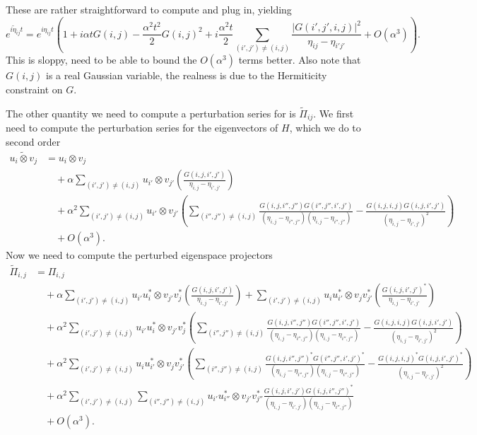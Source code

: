 \documentclass{article}
\newcommand{\parens}[1]{\left( #1 \right)}
\newcommand{\abs}[1]{\left| #1 \right|}
\newcommand{\bigo}[1]{O\left( #1 \right)}
\begin{document}
These are rather straightforward to compute and plug in, yielding
\begin{equation}
    e^{i \widetilde{\eta}_{ij} t} = e^{i \eta_{ij} t}\parens{1 + i \alpha t G(i,j) - \frac{\alpha^2 t^2}{2} G(i,j)^2 + i \frac{\alpha^2 t}{2} \sum_{(i',j') \neq (i,j)}\frac{\abs{G(i',j',i,j)}^2}{\eta_{ij} - \eta_{i' j'}} + \bigo{\alpha^3}}.
\end{equation}
This is sloppy, need to be able to bound the $\bigo{\alpha^3}$ terms better. Also note that $G(i,j)$ is a real Gaussian variable, the realness is due to the Hermiticity constraint on $G$. 

The other quantity we need to compute a perturbation series for is $\widetilde{\Pi}_{ij}$. We first need to compute the perturbation series for the eigenvectors of $H$, which we do to second order
\begin{align}
    \widetilde{u_i \otimes v_j} &= u_i \otimes v_j \\
    &\quad + \alpha \sum_{(i',j') \neq (i,j)} u_{i'} \otimes v_{j'} \parens{  \frac{G(i,j,i',j')}{\eta_{i,j} - \eta_{i',j'}} } \\
    &\quad + \alpha^2 \sum_{(i',j') \neq (i,j)} u_{i'} \otimes v_{j'} \parens{ \sum_{(i'',j'') \neq (i,j)} \frac{G(i,j,i'',j'') G(i'',j'',i',j')}{(\eta_{i,j} - \eta_{i'',j''})(\eta_{i,j} - \eta_{i'',j''})} -  \frac{G(i,j,i,j) G(i,j,i',j')}{(\eta_{i,j} - \eta_{i',j'})^2}} \\
    &\quad + \bigo{\alpha^3}.
\end{align}
Now we need to compute the perturbed eigenspace projectors
\begin{align}
    \widetilde{\Pi}_{i,j} &= \Pi_{i,j} \\
    & \quad + \alpha \sum_{(i',j') \neq (i,j)} u_{i'} u_i^* \otimes v_{j'} v_j^* \parens{  \frac{G(i,j,i',j')}{\eta_{i,j} - \eta_{i',j'}} } + \sum_{(i',j') \neq (i,j)} u_i u_{i'}^* \otimes v_j v_{j'}^* \parens{  \frac{G(i,j,i',j')^*}{\eta_{i,j} - \eta_{i',j'}} } \\
    & \quad + \alpha^2 \sum_{(i',j') \neq (i,j)} u_{i'} u_i^* \otimes v_{j'} v_j^* \parens{ \sum_{(i'',j'') \neq (i,j)} \frac{G(i,j,i'',j'') G(i'',j'',i',j')}{(\eta_{i,j} - \eta_{i'',j''})(\eta_{i,j} - \eta_{i'',j''})} -  \frac{G(i,j,i,j) G(i,j,i',j')}{(\eta_{i,j} - \eta_{i',j'})^2}} \\
    & \quad + \alpha^2 \sum_{(i',j') \neq (i,j)} u_i u_{i'}^* \otimes v_j v_{j'}^* \parens{ \sum_{(i'',j'') \neq (i,j)} \frac{G(i,j,i'',j'')^* G(i'',j'',i',j')^*}{(\eta_{i,j} - \eta_{i'',j''})(\eta_{i,j} - \eta_{i'',j''})} -  \frac{G(i,j,i,j)^* G(i,j,i',j')^*}{(\eta_{i,j} - \eta_{i',j'})^2}} \\
    & \quad + \alpha^2 \sum_{(i',j') \neq (i,j)} \sum_{(i'',j'') \neq (i,j)} u_{i'}u_{i''}^* \otimes v_{j'} v_{j''}^* \frac{G(i,j,i',j') G(i,j,i'',j'')^*}{(\eta_{i,j} - \eta_{i',j'})(\eta_{i,j} - \eta_{i'',j''})} \\
    & \quad + \bigo{\alpha^3}.
\end{align}
\end{document}
